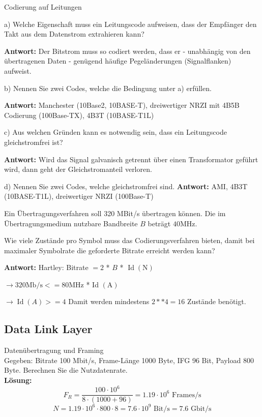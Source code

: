  \begin{example2}{Codierung auf Leitungen}

  a) Welche Eigenschaft muss ein Leitungscode aufweisen, dass der Empfänger den Takt aus dem Datenstrom extrahieren kann?
  
  \textbf{Antwort:} Der Bitstrom muss so codiert werden, dass er - unabhängig von den übertragenen Daten - genügend häufige Pegeländerungen (Signalflanken) aufweist.
  
  b) Nennen Sie zwei Codes, welche die Bedingung unter a) erfüllen.
  
  \textbf{Antwort:} Manchester (10Base2, 10BASE-T), dreiwertiger NRZI mit 4B5B Codierung (100Base-TX), 4B3T (10BASE-T1L)
  
  c) Aus welchen Gründen kann es notwendig sein, dass ein Leitungscode gleichstromfrei ist? 
  
  \textbf{Antwort:} Wird das Signal galvanisch getrennt über einen Transformator geführt wird, dann geht der Gleichstromanteil verloren.
  
  d) Nennen Sie zwei Codes, welche gleichstromfrei sind. \textbf{Antwort:} AMI, 4B3T (10BASE-T1L), dreiwertiger NRZI (100Base-T)
 \end{example2}

 \begin{example2}{Ein Übertragungsverfahren}
  soll 320 MBit/s übertragen können. Die im Übertragungsmedium nutzbare Bandbreite $B$ beträgt $40 \mathrm{MHz}$.

Wie viele Zustände pro Symbol muss das Codierungsverfahren bieten, damit bei maximaler Symbolrate die geforderte Bitrate erreicht werden kann? 

\textbf{Antwort:}
Hartley: Bitrate $=2$ * $B$ * $\operatorname{Id}(\mathrm{N})$

$\rightarrow 320 \mathrm{Mb} / \mathrm{s}<=80 \mathrm{MHz}$ * Id $(\mathrm{A})$

$\rightarrow \operatorname{Id}(A)>=4$ Damit werden mindestens $2 * * 4=16$ Zustände benötigt.
 \end{example2}

\subsection*{Data Link Layer}

\begin{example2}{Datenübertragung und Framing}\\
    Gegeben: Bitrate 100 Mbit/s, Frame-Länge 1000 Byte, IFG 96 Bit, Payload 800 Byte. Berechnen Sie die Nutzdatenrate.\\
    \textbf{Lösung:}\\
    $$F_R = \frac{100 \cdot 10^6}{8 \cdot (1000 + 96)} = 1.19 \cdot 10^6 \text{ Frames/s}$$
    $$N = 1.19 \cdot 10^6 \cdot 800 \cdot 8 = 7.6 \cdot 10^9 \text{ Bit/s} = 7.6 \text{ Gbit/s}$$
\end{example2}

